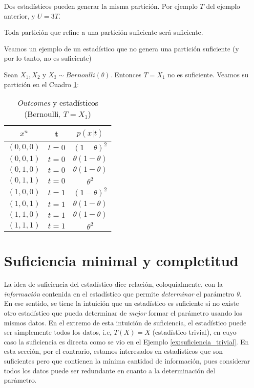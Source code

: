 \begin{remark}
Dos estadísticos pueden generar la misma partición. Por ejemplo $T$ del ejemplo anterior, y $U= 3 T$. 
\end{remark}
\begin{remark}
Toda partición que refine a una partición suficiente será suficiente.
\end{remark}
Veamos un ejemplo de un estadístico que no genera una partición suficiente (y por lo tanto, no es suficiente)
\begin{example}
Sean $X_1,X_2$ y $X_3 \sim Bernoulli(\theta)$. Entonces $T=X_1$ no es suficiente. Veamos su partición en el Cuadro \ref{tab: Part.Bernoulli no-suficiente}: 
\begin{table}[h]
    \centering
    \begin{tabular}{c  c  c}  
        $x^{n} $  & t  & $ p(x|t) $\\ \hline
        $ (0,0,0) $ & $t=0$ & $(1-\theta)^2$ \\  
       $ (0,0,1) $ & $t= 0$ & $\theta(1-\theta)$   \\
        $ (0,1,0) $ & $t=0$ & $\theta(1-\theta)$ \\
        $ (0,1,1) $ & $t=0$ & $\theta^2$   \\ \hline 
        $ (1,0,0) $  & $t=1$ & $(1-\theta)^2$ \\  
        $ (1,0,1) $ & $t=1$ & $\theta(1-\theta)$ \\
        $ (1,1,0) $  & $t=1$ & $\theta(1-\theta)$ \\ 
        $ (1,1,1) $ & $t= 1$ & $\theta^2$ \\
    \end{tabular}
    \caption{\emph{Outcomes} y estadísticos (Bernoulli, $T= X_1$)  }
        \label{tab: Part.Bernoulli no-suficiente}
\end{table}

\end{example}


\section{Suficiencia minimal y completitud}
La idea de suficiencia del estadístico dice relación, coloquialmente, con la \textit{información} contenida en el estadístico que permite \textit{determinar} el parámetro $\theta$. En ese sentido, se tiene la intuición que un estadístico es suficiente si no existe otro estadístico que pueda determinar de \textit{mejor} formar el parámetro usando los mismos datos. En el extremo de esta intuición de suficiencia, el estadístico puede ser simplemente todos los datos, i.e, $T(X)=X$ (estadístico trivial), en cuyo caso la suficiencia es directa como se vio en el Ejemplo \ref{ex:suficiencia_trivial}. En esta sección, por el contrario, estamos interesados en estadísticos que son suficientes pero que contienen la mínima cantidad de información, pues considerar todos los datos puede ser redundante en cuanto a la determinación del parámetro.\\ 

